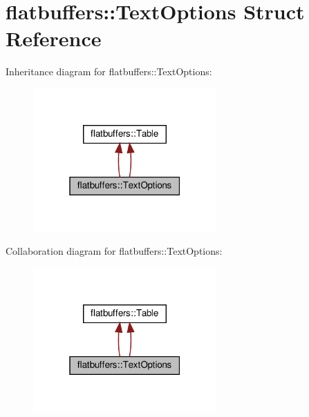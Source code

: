 \hypertarget{structflatbuffers_1_1TextOptions}{}\section{flatbuffers\+:\+:Text\+Options Struct Reference}
\label{structflatbuffers_1_1TextOptions}


Inheritance diagram for flatbuffers\+:\+:Text\+Options\+:
\nopagebreak
\begin{figure}[H]
\begin{center}
\leavevmode
\includegraphics[width=199pt]{structflatbuffers_1_1TextOptions__inherit__graph}
\end{center}
\end{figure}


Collaboration diagram for flatbuffers\+:\+:Text\+Options\+:
\nopagebreak
\begin{figure}[H]
\begin{center}
\leavevmode
\includegraphics[width=199pt]{structflatbuffers_1_1TextOptions__coll__graph}
\end{center}
\end{figure}
